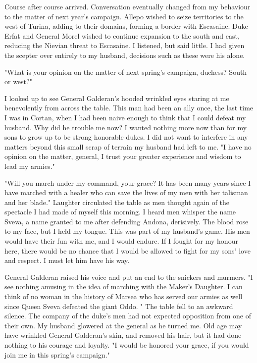 \documentclass{article}
\begin{document}
Course after course arrived. Conversation eventually changed from my behaviour to the matter of next year's campaign. Allepo wished to seize territories to the west of Turina, adding to their domains, forming a border with Escasaine. Duke Erfat and General Morel wished to continue expansion to the south and east, reducing the Nievian threat to Escasaine. I listened, but said little. I had given the scepter over entirely to my husband, decisions such as these were his alone.

"What is your opinion on the matter of next spring's campaign, duchess? South or west?"

I looked up to see General Galderan's hooded wrinkled eyes staring at me benevolently from across the table. This man had been an ally once, the last time I was in Cortan, when I had been naive enough to think that I could defeat my husband. Why did he trouble me now? I wanted nothing more now than for my sons to grow up to be strong honorable dukes. I did not want to interfere in any matters beyond this small scrap of terrain my husband had left to me. "I have no opinion on the matter, general, I trust your greater experience and wisdom to lead my armies."

"Will you march under my command, your grace? It has been many years since I have marched with a healer who can save the lives of my men with her talisman and her blade." Laughter circulated the table as men thought again of the spectacle I had made of myself this morning. I heard men whisper the name Sveva, a name granted to me after defending Andona, derisively. The blood rose to my face, but I held my tongue. This was part of my husband's game. His men would have their fun with me, and I would endure. If I fought for my honour here, there would be no chance that I would be allowed to fight for my sons' love and respect. I must let him have his way.

General Galderan raised his voice and put an end to the snickers and murmers. "I see nothing amusing in the idea of marching with the Maker's Daughter. I can think of no woman in the history of Marsea who has served our armies as well since Queen Sveva defeated the giant Oddo. " The table fell to an awkward silence. The company of the duke's men had not expected opposition from one of their own. My husband glowered at the general as he turned me. Old age may have wrinkled General Galderan's skin, and removed his hair, but it had done nothing to his courage and loyalty. "I would be honored your grace, if you would join me in this spring's campaign."
\end{document}

